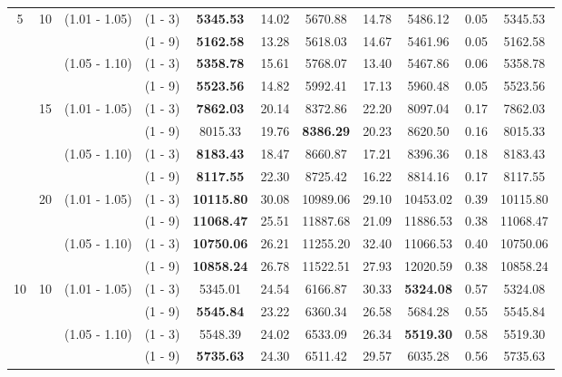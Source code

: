 \documentclass[a4paper,11pt]{article}
\begin{document}
\begin{table}[!ht]
\begin{tabular}{|c|c|c|c|c|c|c|c|c|c|c|}
5& 10 & (1.01 - 1.05) & (1 - 3)  &  \textbf{5345.53}  &  14.02      &  5670.88  &  14.78      &  5486.12  &  0.05      &  5345.53  \\
 &  &  & (1 - 9)  &  \textbf{5162.58}  &  13.28      &  5618.03  &  14.67      &  5461.96  &  0.05      &  5162.58  \\
 &  & (1.05 - 1.10) & (1 - 3)  &  \textbf{5358.78} &  15.61      &  5768.07  &  13.40      &  5467.86  &  0.06      &  5358.78  \\
 &  &  & (1 - 9)  &  \textbf{5523.56}  &  14.82      &  5992.41  &  17.13      &  5960.48  &  0.05      &  5523.56  \\
 & 15 & (1.01 - 1.05) & (1 - 3)  &  \textbf{7862.03}  &  20.14      &  8372.86  &  22.20      &  8097.04  &  0.17      &  7862.03  \\
 &   &  & (1 - 9)  &  8015.33  &  19.76      &  \textbf{8386.29}  &  20.23      &  8620.50  &  0.16      &  8015.33  \\
 &   & (1.05 - 1.10) & (1 - 3)  &  \textbf{8183.43}  &  18.47      &  8660.87  &  17.21      &  8396.36  &  0.18      &  8183.43  \\
 &   &  & (1 - 9)  &  \textbf{8117.55}  &  22.30      &  8725.42  &  16.22      &  8814.16  &  0.17      &  8117.55  \\
 & 20  & (1.01 - 1.05) & (1 - 3)  &  \textbf{10115.80}  &  30.08      &  10989.06  &  29.10      &  10453.02  &  0.39      &  10115.80 \\
 &   &   & (1 - 9)  &  \textbf{11068.47}  &  25.51      &  11887.68  &  21.09      &  11886.53  &  0.38      &  11068.47 \\
 &   & (1.05 - 1.10) & (1 - 3)  &  \textbf{10750.06}  &  26.21      &  11255.20  &  32.40      &  11066.53  &  0.40      &  10750.06 \\
 &   &  & (1 - 9)  &  \textbf{10858.24}  &  26.78      &  11522.51  &  27.93      &  12020.59  &  0.38      &  10858.24 \\
10& 10 & (1.01 - 1.05) & (1 - 3)  &  5345.01  &  24.54      &  6166.87  &  30.33      &  \textbf{5324.08}  &  0.57      &  5324.08 \\
 &  &  & (1 - 9)  &  \textbf{5545.84}  &  23.22      &  6360.34  &  26.58      &  5684.28  &  0.55      &  5545.84 \\
 &  & (1.05 - 1.10) & (1 - 3)  &  5548.39  &  24.02      &  6533.09  &  26.34      &  \textbf{5519.30}  &  0.58      &  5519.30 \\
 &  &  & (1 - 9)  &  \textbf{5735.63} &  24.30      &  6511.42  &  29.57      &  6035.28  &  0.56      &  5735.63 \\

\end{tabular}
\end{table}
\end{document}
